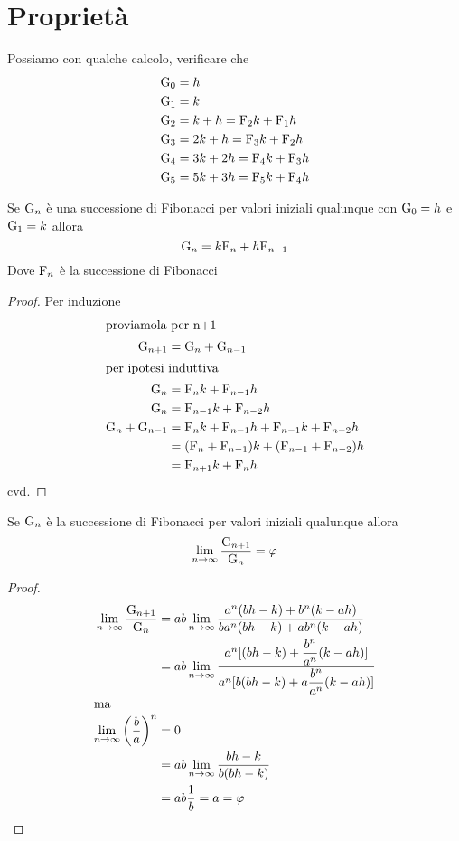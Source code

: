 \section{Proprietà}
Possiamo con qualche calcolo, verificare che
\begin{align*}
\mathrm{G}_{0}={}&h\\
\mathrm{G}_{1}={}&k\\
\mathrm{G}_{2}={}&k+h=\mathrm{F}_{2}k+\mathrm{F}_{1}h\\
\mathrm{G}_{3}={}&2k+h=\mathrm{F}_{3}k+\mathrm{F}_{2}h\\
\mathrm{G}_{4}={}&3k+2h=\mathrm{F}_{4}k+\mathrm{F}_{3}h\\
\mathrm{G}_{5}={}&5k+3h=\mathrm{F}_{5}k+\mathrm{F}_{4}h                                              
\end{align*} 
\begin{thm}[Derivazione]
	Se $\mathrm{G}_{n}$ è una successione di Fibonacci per valori iniziali qualunque  
	con $\mathrm{G}_{0}=h$ 
	e $\mathrm{G}_{1}=k $ allora
	\begin{equation}
		\mathrm{G}_{n}=k\mathrm{F}_{n}+h\mathrm{F}_{n-1}
	\end{equation}\label{thm:FibGenDer}
	Dove $\mathrm{F}_{n}$ è la successione di Fibonacci
\end{thm}
\begin{proof}
Per induzione
\begin{align*}
\intertext{proviamola per n+1}
		\mathrm{G}_{n+1}={}&\mathrm{G}_{n}+\mathrm{G}_{n-1}\\
\intertext{per ipotesi induttiva}
\mathrm{G}_{n}={}&\mathrm{F}_{n}k+\mathrm{F}_{n-1}h\\
\mathrm{G}_{n}={}&\mathrm{F}_{n-1}k+\mathrm{F}_{n-2}h\\
\mathrm{G}_{n}+\mathrm{G}_{n-1}={}&\mathrm{F}_{n}k+\mathrm{F}_{n-1}h+\mathrm{F}_{n-1}k+\mathrm{F}_{n-2}h\\
={}&(\mathrm{F}_{n}+\mathrm{F}_{n-1})k+(\mathrm{F}_{n-1}+\mathrm{F}_{n-2})h\\
={}&\mathrm{F}_{n+1}k+\mathrm{F}_{n}h\\
\end{align*}
cvd.
\end{proof}
\begin{thm}
	Se $\mathrm{G}_{n}$ è la successione di Fibonacci per valori iniziali qualunque 
	allora 
	\begin{equation}
		\lim_{n\to\infty}\dfrac{\mathrm{G}_{n+1}}{\mathrm{G}_{n}}=\varphi
	\end{equation}\label{eqn:FibLimRapGen}
\end{thm}
\begin{proof}
	\begin{align*}
		\lim_{n\to\infty}\dfrac{\mathrm{G}_{n+1}}{\mathrm{G}_{n}}={}&ab\lim_{n\to\infty}\dfrac{a^n(bh-k)+b^n(k-ah)}{ba^n(bh-k)+ab^n(k-ah)}\\
		={}&ab\lim_{n\to\infty}\dfrac{a^n[(bh-k)+\dfrac{b^n}{a^n}(k-ah)]}{a^n[b(bh-k)+a\dfrac{b^n}{a^n}(k-ah)]}\\
		\intertext{ma}
	\lim_{n\to\infty}\left(\dfrac{b}{a}\right)^n={}&0\\
={}&ab\lim_{n\to\infty}\dfrac{bh-k}{b(bh-k)}\\
={}&ab\dfrac{1}{b}=a=\varphi\\
	\end{align*}
 \end{proof}

